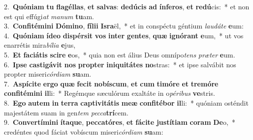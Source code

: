 {2.~}\textbf{Quó}\textbf{ni}\textbf{am} \textbf{tu} \textbf{fla}\textbf{gél}\textbf{las}, \textbf{et} \textbf{sal}\textbf{vas}: \textbf{de}\textbf{dú}\textbf{cis} \textbf{ad} \textbf{ín}\textbf{fe}\textbf{ros}, \textbf{et} \textbf{re}\textbf{dú}cis:~* et non est qui effúgi\textit{at} \textit{ma}\textit{num} \textbf{tu}am.\\
{3.~}\textbf{Con}\textbf{fi}\textbf{té}\textbf{mi}\textbf{ni} \textbf{Dó}\textbf{mi}\textbf{no}, \textbf{fí}\textbf{li}\textbf{i} \textbf{Is}\textbf{ra}ël,~* et in conspéctu géntium \textit{lau}\textit{dá}\textit{te} \textbf{e}um:\\
{4.~}\textbf{Quó}\textbf{ni}\textbf{am} \textbf{í}\textbf{de}\textbf{o} \textbf{di}\textbf{spér}\textbf{sit} \textbf{vos} \textbf{in}\textbf{ter} \textbf{gen}\textbf{tes}, \textbf{quæ} \textbf{i}\textbf{gnó}\textbf{rant} \textbf{e}um,~* ut vos enarrétis mira\textit{bí}\textit{li}\textit{a} \textbf{e}jus,\\
{5.~}\textbf{Et} \textbf{fa}\textbf{ci}\textbf{á}\textbf{tis} \textbf{sci}\textbf{re} \textbf{e}os,~* quia non est álius Deus omnípo\textit{tens} \textit{præ}\textit{ter} \textbf{e}um.\\
{6.~}\textbf{I}\textbf{pse} \textbf{ca}\textbf{sti}\textbf{gá}\textbf{vit} \textbf{nos} \textbf{prop}\textbf{ter} \textbf{i}\textbf{ni}\textbf{qui}\textbf{tá}\textbf{tes} \textbf{no}stras:~* et ipse salvábit nos propter miseri\textit{cór}\textit{di}\textit{am} \textbf{su}am.\\
{7.~}\textbf{A}\textbf{spí}\textbf{ci}\textbf{te} \textbf{er}\textbf{go} \textbf{quæ} \textbf{fe}\textbf{cit} \textbf{no}\textbf{bí}\textbf{scum}, \textbf{et} \textbf{cum} \textbf{ti}\textbf{mó}\textbf{re} \textbf{et} \textbf{tre}\textbf{mó}\textbf{re} \textbf{con}\textbf{fi}\textbf{té}\textbf{mi}\textbf{ni} \textbf{il}li:~* Regémque sæculórum exaltáte in o\textit{pé}\textit{ri}\textit{bus} \textbf{ve}stris.\\
{8.~}\textbf{E}\textbf{go} \textbf{au}\textbf{tem} \textbf{in} \textbf{ter}\textbf{ra} \textbf{cap}\textbf{ti}\textbf{vi}\textbf{tá}\textbf{tis} \textbf{me}\textbf{æ} \textbf{con}\textbf{fi}\textbf{té}\textbf{bor} \textbf{il}li:~* quóniam osténdit majestátem suam in gen\textit{tem} \textit{pec}\textit{ca}\textbf{trí}cem.\\
{9.~}\textbf{Con}\textbf{ver}\textbf{tí}\textbf{mi}\textbf{ni} \textbf{í}\textbf{ta}\textbf{que}, \textbf{pec}\textbf{ca}\textbf{tó}\textbf{res}, \textbf{et} \textbf{fá}\textbf{ci}\textbf{te} \textbf{ju}\textbf{stí}\textbf{ti}\textbf{am} \textbf{co}\textbf{ram} \textbf{De}o,~* credéntes quod fáciat vobíscum miseri\textit{cór}\textit{di}\textit{am} \textbf{su}am:\\
